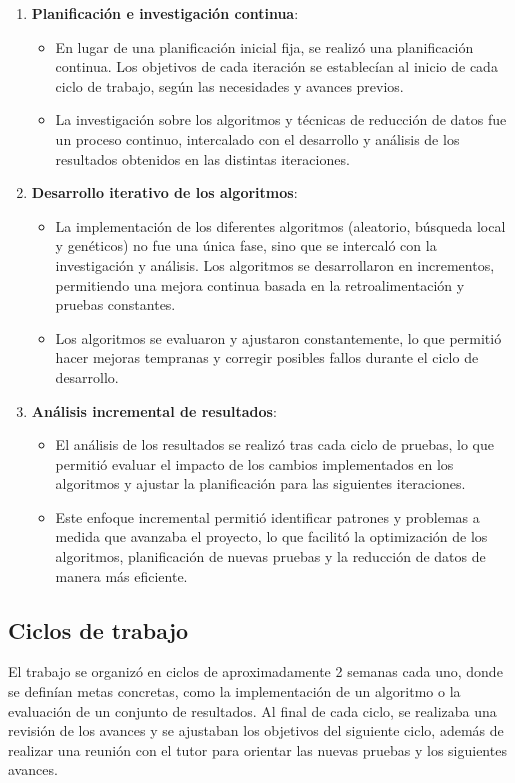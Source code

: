 \begin{enumerate}
    \item \textbf{Planificación e investigación continua}:
    \begin{itemize}
        \item En lugar de una planificación inicial fija, se realizó una planificación continua.
Los objetivos de cada iteración se establecían al inicio de cada ciclo de trabajo, según las necesidades y avances
previos.
        \item La investigación sobre los algoritmos y técnicas de reducción de datos fue un proceso continuo,
intercalado con el desarrollo y análisis de los resultados obtenidos en las distintas iteraciones.
    \end{itemize}

    \item \textbf{Desarrollo iterativo de los algoritmos}:
    \begin{itemize}
        \item La implementación de los diferentes algoritmos (aleatorio, búsqueda local y genéticos) no fue una única
fase, sino que se intercaló con la investigación y análisis.
Los algoritmos se desarrollaron en incrementos, permitiendo una mejora continua basada en la retroalimentación y
pruebas constantes.
        \item Los algoritmos se evaluaron y ajustaron constantemente, lo que permitió hacer mejoras tempranas y
corregir posibles fallos durante el ciclo de desarrollo.
    \end{itemize}

    \item \textbf{Análisis incremental de resultados}:
    \begin{itemize}
        \item El análisis de los resultados se realizó tras cada ciclo de pruebas, lo que permitió evaluar el impacto
de los cambios implementados en los algoritmos y ajustar la planificación para las siguientes iteraciones.
        \item Este enfoque incremental permitió identificar patrones y problemas a medida que avanzaba el proyecto, lo
que facilitó la optimización de los algoritmos, planificación de nuevas pruebas y la reducción de datos de manera más
eficiente.
    \end{itemize}
\end{enumerate}

\subsection{Ciclos de trabajo}\label{subsec:ciclos-de-trabajo}
El trabajo se organizó en ciclos de aproximadamente 2 semanas cada uno, donde se definían metas concretas,
como la implementación de un algoritmo o la evaluación de un conjunto de resultados.
Al final de cada ciclo, se realizaba una revisión de los avances y se ajustaban los objetivos del siguiente ciclo,
además de realizar una reunión con el tutor para orientar las nuevas pruebas y los siguientes avances. \\[6pt]


